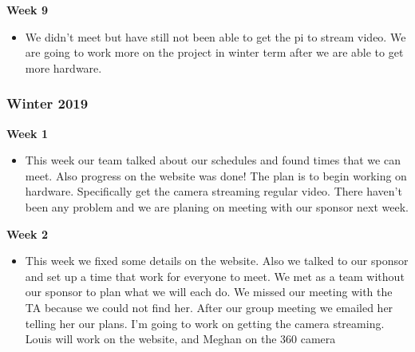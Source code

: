 \documentclass[onecolumn, draftclsnofoot,10pt, compsoc]{IEEEtran}
\begin{document}
            \textbf{Week 9}
            \begin{itemize}
                \item We didn't meet but have still not been able to get the pi to stream video. We are going to work more on the project in winter term after we are able to get more hardware.
            \end{itemize}
    
        \subsubsection{Winter 2019}
            \textbf{Week 1}
            \begin{itemize}
                \item This week our team talked about our schedules and found times that we can meet. Also progress on the website was done! The plan is to begin working on hardware. Specifically get the camera streaming regular video. There haven't been any problem and we are planing on meeting with our sponsor next week. 
            \end{itemize}
            
            \textbf{Week 2}
            \begin{itemize}
                \item This week we fixed some details on the website. Also we talked to our sponsor and set up a time that work for everyone to meet. We met as a team without our sponsor to plan what we will each do. We missed our meeting with the TA because we could not find her. After our group meeting we emailed her telling her our plans. I’m going to work on getting the camera streaming.  Louis will work on the website, and Meghan on the 360 camera 
            \end{itemize}
            
\end{document}
